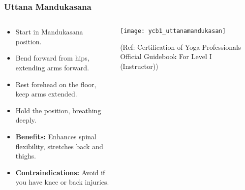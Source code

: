 \begin{frame}[fragile]\frametitle{Uttana Mandukasana}
\begin{columns}
    \begin{column}[T]{0.5\linewidth}
      \begin{itemize}
        \item Start in Mandukasana position.
        \item Bend forward from hips, extending arms forward.
        \item Rest forehead on the floor, keep arms extended.
        \item Hold the position, breathing deeply.
        \item \textbf{Benefits:} Enhances spinal flexibility, stretches back and thighs.
        \item \textbf{Contraindications:} Avoid if you have knee or back injuries.
      \end{itemize}
    \end{column}
    \begin{column}[T]{0.5\linewidth}
        \begin{center}
        \begin{center}
		        \texttt{[image: ycb1\_uttanamandukasan]}
				
				{\tiny (Ref: Certification  of Yoga Professionals Official Guidebook For Level I (Instructor))}	        
		\end{center}   
        \end{center}    
    \end{column}
  \end{columns}
\end{frame}

